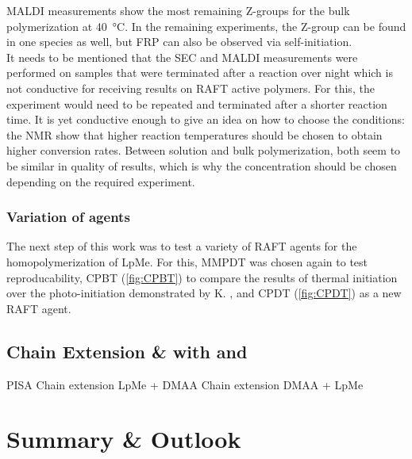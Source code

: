 \documentclass[11pt]{scrreport}
\let\cite=\supercite
\begin{document}
	\gls{MALDI} measurements show the most remaining Z-groups for the bulk polymerization at \SI{40}{\degreeCelsius}. In the remaining experiments, the Z-group can be found in one species as well, but \gls{FRP} can also be observed via self-initiation.\\
	It needs to be mentioned that the \gls{SEC} and \gls{MALDI} measurements were performed on samples that were terminated after a reaction over night which is not conductive for receiving results on \gls{RAFT} active polymers. For this, the experiment would need to be repeated and terminated after a shorter reaction time. It is yet conductive enough to give an idea on how to choose the conditions: the \gls{NMR} show that higher reaction temperatures should be chosen to obtain higher conversion rates. Between solution and bulk polymerization, both seem to be similar in quality of results, which is why the concentration should be chosen depending on the required experiment.
	\subsection{Variation of  agents}
	The next step of this work was to test a variety of \gls{RAFT} agents for the homopolymerization of \gls{LpMe}. For this, \gls{MMPDT} was chosen again to test reproducability, \gls{CPBT} (\autoref{fig:CPBT}) to compare the results of thermal initiation over the photo-initiation demonstrated by K. \citeauthor{lee_controlled_2025}, and \gls{CPDT} (\autoref{fig:CPDT}) as a new \gls{RAFT} agent.\cite{lee_controlled_2025}
	\section{Chain Extension \&  with  and }
	PISA
	Chain extension LpMe + DMAA
	Chain extension DMAA + LpMe
	\chapter{Summary \& Outlook}
	
	\newpage
	\printnoidxglossary[type=acronym]
	\listoffigures
	\listoftables
	\printbibliography
	\clearpage
	\renewcommand*{\thepage}{A\arabic{page}}
	\makeatletter 
	\renewcommand{\thefigure}{A\@arabic\c@figure}
	\renewcommand{\thetable}{A\@arabic\c@table}
	\makeatother
\end{document}
